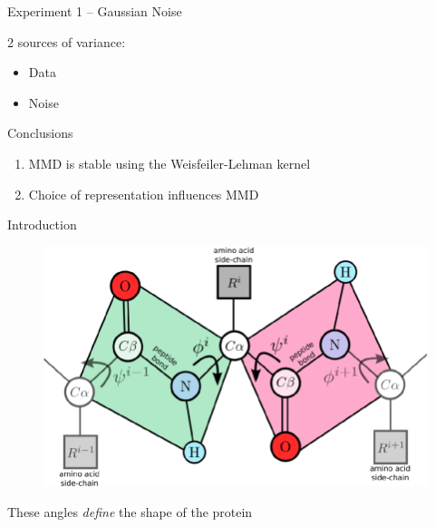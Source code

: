 \documentclass[aspectratio=169, 10pt, dvipsnames]{beamer}
\begin{document}
\begin{frame}[fragile]{Experiment 1 -- Gaussian Noise}
\begin{minipage}{0.38\linewidth}
    \pause\small 2 sources of variance:
    \begin{itemize}
      \pause\small\item Data
      \pause\small\item Noise
  \end{itemize}

  \begin{alert}{Conclusions}
    \begin{enumerate}
      \pause\item MMD is stable using the Weisfeiler-Lehman kernel
      \pause\item Choice of representation influences MMD
    \end{enumerate}
  \end{alert}
  \end{minipage}
\end{frame}


{
  \begin{frame}[fragile]{Introduction}
    \begin{minipage}{0.7\textwidth}
      \begin{figure}
        \centering
        \includegraphics[width=\textwidth]{./figures/phi_psi.png}
      \end{figure}
    \end{minipage}
    \hfill
    \begin{minipage}{0.25\textwidth}
      \small These angles \emph{define} the shape of the protein
    \end{minipage}
  \end{frame}
}
\end{document}
